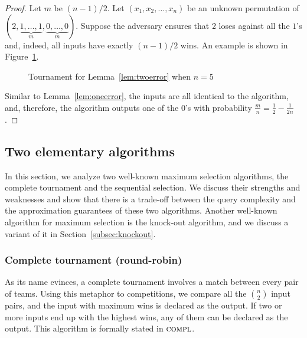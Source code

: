 \documentclass[twoside,11pt]{article}
\newcommand{\algorithms}[1]{\textsc{#1}}
\newcommand{\algcomp}{\algorithms{compl}}
\begin{document}
\begin{proof}
Let $m$ be $(n-1)/2$. Let $(x_1,x_2,\ldots,x_n)$ be an unknown permutation of
$(2,\underbrace{1,\ldots,1}_{m},\underbrace{0,\ldots,0}_{m})$.
Suppose the adversary ensures that 2 loses
against all the $1$'s and, indeed, all inputs have exactly $(n-1)/2$
wins. An example is shown in Figure~\ref{fig:tournament_for_error_two}. 
\begin{figure}
\begin{center}
\end{center}
 \caption{Tournament for Lemma~\ref{lem:twoerror} when $n=5$}
 \label{fig:tournament_for_error_two}
\end{figure}

Similar to Lemma~\ref{lem:oneerror}, the inputs are all identical to the algorithm, and, therefore, 
the algorithm outputs one of the $0$'s with probability $\frac{m}{n}=\frac12-\frac1{2n}$. 
\end{proof}
\subsection{Two elementary algorithms}
\label{sec:elementary}
In this section, we analyze two well-known maximum selection algorithms,
the complete tournament and the sequential selection. We discuss their
strengths and weaknesses and show that there is a trade-off between
the query complexity and the approximation guarantees
of these two algorithms. Another well-known algorithm for maximum
selection is the knock-out algorithm, and we discuss a variant of
it in Section~\ref{subsec:knockout}.
\subsubsection{Complete tournament (round-robin)}
\label{subsec:complete}
As its name evinces, a complete tournament involves a match between
every pair of teams. Using this metaphor to competitions, we
compare all the  $n \choose 2$ input pairs, and the input with 
maximum wins is declared as the output. If two or more inputs end up with the highest  
wins, any of them can be declared as the output. This algorithm is
formally stated in $\algcomp$.  
\end{document}
